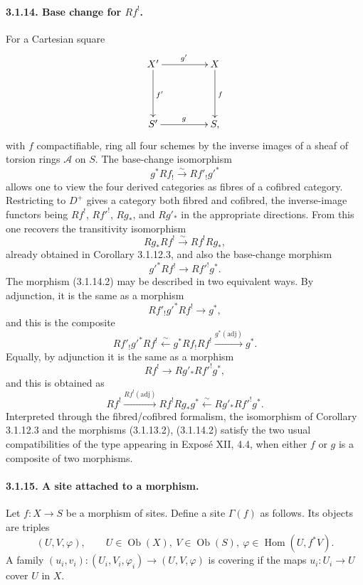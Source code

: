 \documentclass[12pt]{article}
\newcommand{\Aa}{\mathcal A}
\DeclareMathOperator{\Hom}{Hom}
\DeclareMathOperator{\Ob}{Ob}
\begin{document}
\paragraph{3.1.14. Base change for \texorpdfstring{$Rf^!$}{Rf!}.}
For a Cartesian square
\[
\xymatrix@=1.6cm{
X'\ar[r]^{g'}\ar[d]^{f'}&X\ar[d]^f\\
S'\ar[r]^g&S,
}
\]
with $f$ compactifiable, ring all four schemes by the inverse images of a sheaf of torsion rings $\Aa$ on $S$. The base-change isomorphism
\begin{equation}
   g^*Rf_!\xrightarrow{\sim}Rf'_!{g'}^* \tag{3.1.14.1}
\end{equation}
allows one to view the four derived categories as fibres of a cofibred category. Restricting to $D^+$ gives a category both fibred and cofibred, the inverse-image functors being $Rf^!$, $R{f'}^!$, $Rg_*$, and $Rg'_*$ in the appropriate directions. From this one recovers the transitivity isomorphism
\[
   Rg_*Rf^!\xrightarrow{\sim}Rf^!Rg_*,
\]
already obtained in Corollary 3.1.12.3, and also the base-change morphism
\begin{equation}
   {g'}^*Rf^!\longrightarrow R{f'}^!g^*. \tag{3.1.14.2}
\end{equation}
The morphism (3.1.14.2) may be described in two equivalent ways. By adjunction, it is the same as a morphism
\[
   Rf'_!{g'}^*Rf^!\longrightarrow g^*,
\]
and this is the composite
\[
   Rf'_!{g'}^*Rf^!\xleftarrow{\sim}g^*Rf_!Rf^!
      \xrightarrow{g^*(\mathrm{adj})} g^*.
\]
Equally, by adjunction it is the same as a morphism
\[
   Rf^!\longrightarrow Rg'_*R{f'}^!g^*,
\]
and this is obtained as
\[
   Rf^!\xrightarrow{Rf^!(\mathrm{adj})}Rf^!Rg_*g^*
      \xleftarrow{\sim}Rg'_*R{f'}^!g^*.
\]
Interpreted through the fibred/cofibred formalism, the isomorphism of Corollary 3.1.12.3 and the morphisms (3.1.13.2), (3.1.14.2) satisfy the two usual compatibilities of the type appearing in Expos\'e XII, 4.4, when either $f$ or $g$ is a composite of two morphisms.

\paragraph{3.1.15. A site attached to a morphism.}
Let $f:X\to S$ be a morphism of sites. Define a site $\Gamma(f)$ as follows. Its objects are triples
\[
   (U,V,\varphi),\qquad U\in\Ob(X),\ V\in\Ob(S),\ \varphi\in\Hom(U,f^*V).
\]
A family $(u_i,v_i):(U_i,V_i,\varphi_i)\to(U,V,\varphi)$ is covering if the maps $u_i:U_i\to U$ cover $U$ in $X$.
\end{document}
